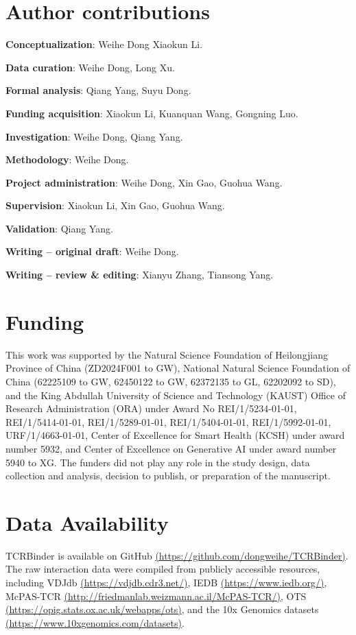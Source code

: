\documentclass[10pt,letterpaper]{article}
\begin{document}
\section*{Author contributions}
\setlength{\parindent}{0pt}
\textbf{Conceptualization}: Weihe Dong Xiaokun Li.

\textbf{Data curation}: Weihe Dong, Long Xu.

\textbf{Formal analysis}: Qiang Yang, Suyu Dong.

\textbf{Funding acquisition}: Xiaokun Li, Kuanquan Wang, Gongning Luo.

\textbf{Investigation}: Weihe Dong, Qiang Yang.

\textbf{Methodology}: Weihe Dong.

\textbf{Project administration}: Weihe Dong, Xin Gao, Guohua Wang.

\textbf{Supervision}: Xiaokun Li, Xin Gao, Guohua Wang.

\textbf{Validation}: Qiang Yang.

\textbf{Writing -- original draft}: Weihe Dong.

\textbf{Writing -- review \& editing}: Xianyu Zhang, Tiansong Yang.


\section*{Funding}
This work was supported by the Natural Science Foundation of Heilongjiang Province of China (ZD2024F001 to GW), National Natural Science Foundation of China (62225109 to GW, 62450122 to GW, 62372135 to GL, 62202092 to SD), and the King Abdullah University of Science and Technology (KAUST) Office of Research Administration (ORA) under Award No REI/1/5234-01-01, REI/1/5414-01-01, REI/1/5289-01-01, REI/1/5404-01-01, REI/1/5992-01-01, URF/1/4663-01-01, Center of Excellence for Smart Health (KCSH) under award number 5932, and Center of Excellence on Generative AI under award number 5940 to XG. The funders
did not play any role in the study design, data collection and analysis, decision to publish, or preparation of the manuscript.


\section*{Data Availability}
TCRBinder is available on GitHub \href{https://github.com/dongweihe/TCRBinder}{(https://github.com/dongweihe/TCRBinder)}. The raw interaction data were compiled from publicly accessible resources, including VDJdb \href{https://vdjdb.cdr3.net/} {(https://vdjdb.cdr3.net/)}, IEDB \href{https://www.iedb.org/}{(https://www.iedb.org/)}, McPAS-TCR \href{http://friedmanlab.weizmann.ac.il/McPAS-TCR/}{(http://friedmanlab.weizmann.ac.il/McPAS-TCR/)}, OTS \href{https://opig.stats.ox.ac.uk/webapps/ots}{(https://opig.stats.ox.ac.uk/webapps/ots)}, and the 10x Genomics datasets \href{https://www.10xgenomics.com/datasets}{(https://www.10xgenomics.com/datasets)}.
\end{document}
